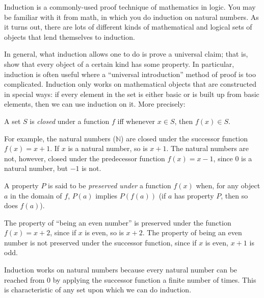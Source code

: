 \documentclass[../../include/open-logic-section]{subfiles}
\begin{document}

\begin{explain}
Induction is a commonly-used proof technique of mathematics in logic.
You may be familiar with it from math, in which you do induction on
natural numbers. As it turns out, there are lots of different kinds of
mathematical and logical sets of objects that lend themselves to induction.

In general, what induction allows one to do is prove a universal claim; that
is, show that every object of a certain kind has some property. In particular,
induction is often useful where a ``universal introduction'' method of proof
is too complicated. Induction only works on mathematical objects that are
constructed in special ways: if every element in the set is either basic or is
built up from basic elements, then we can use induction on it. More precisely:
\end{explain}

\begin{defn}
A set $S$ is \emph{closed} under a function $f$ iff whenever $x \in
S$, then $f(x) \in S$.
\end{defn}

\begin{explain}
For example, the natural numbers ($\mathbb{N}$) are closed under the
successor function $f(x) = x+1$. If $x$ is a natural number, so is
$x+1$. The natural numbers are not, however, closed under the
predecessor function $f(x) = x-1$, since $0$ is a natural number, but
$-1$ is not.
\end{explain}

\begin{defn}
A property $P$ is said to be \emph{preserved under} a function $f(x)$
when, for any object $a$ in the domain of $f$, $P(a)$ implies
$P(f(a))$ (if $a$ has property $P$, then so does $f(a)$).
\end{defn}

\begin{explain}
The property of ``being an even number'' is preserved under the
function $f(x) = x+2$, since if $x$ is even, so is $x+2$. The property
of being an even number is not preserved under the successor function,
since if $x$ is even, $x+1$ is odd.

Induction works on natural numbers because every natural number can be
reached from 0 by applying the successor function a finite number of
times. This is characteristic of any set upon which we can do
induction.
\end{explain}
\end{document}
